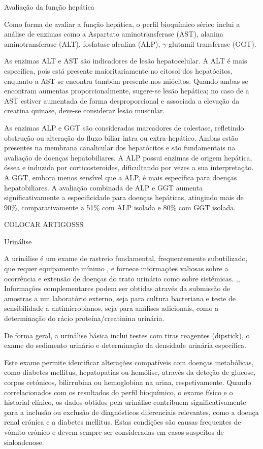 Avaliação da função hepática


Como forma de avaliar a função hepática, o perfil bioquímico sérico inclui a análise de enzimas como a Aspartato aminotransferase (AST), alanina aminotransferase (ALT), fosfatase alcalina (ALP), $\gamma$-glutamil transferase (GGT). 


As enzimas ALT e AST são indicadores de lesão hepatocelular. A ALT é mais específica, pois está presente maioritariamente no citosol dos hepatócitos, enquanto a AST se encontra também presente nos miócitos. Quando ambas se encontram aumentas proporcionalmente, sugere-se lesão hepática; no caso de a AST estiver aumentada de forma desproporcional e associada a elevação da creatina quinase, deve-se considerar lesão muscular.


As enzimas ALP e GGT são consideradas marcadores de colestase, refletindo obstrução ou alteração do fluxo biliar intra ou extra-hepático. Ambas estão presentes na membrana canalicular dos hepatócitos e são fundamentais na avaliação de doenças hepatobiliares. A ALP possui enzimas de origem hepática, óssea e induzida por corticosteroides, dificultando por vezes a sua interpretação. A GGT, embora menos sensível que a ALP, é mais específica para doenças hepatobiliares. A avaliação combinada de ALP e GGT aumenta significativamente a especificidade para doenças hepáticas, atingindo mais de 90\%, comparativamente a 51\% com ALP isolada e 80\% com GGT isolada. 

COLOCAR ARTIGOSSS

Urinálise


A urinálise é um exame de rastreio fundamental, frequentemente subutilizado, que requer equipamento mínimo \cite{Ristic2011},\cite{Kumar2017} e fornece informações valiosas sobre a ocorrência e extensão de doenças do trato urinário como sobre sistémicas. \cite{Ristic2011},\cite{Yadav2020},\cite{Reine2005} Informações complementares podem ser obtidas através da submissão de amostras a um laboratório externo, seja para cultura bacteriana e teste de sensibilidade a antimicrobianos, seja para análises adicionais, como a determinação do rácio proteína/creatinina urinária. \cite{Ristic2011} 


De forma geral, a urinálise básica inclui testes com tiras reagentes (dipstick), o exame do sedimento urinário e determinação da densidade urinária específica. \cite{Ristic2011} 


Este exame permite identificar alterações compatíveis com doenças metabólicas, como diabetes mellitus, hepatopatias ou hemólise, através da deteção de glucose, corpos cetónicos, bilirrubina ou hemoglobina na urina, respetivamente. \cite{Parrah2013} 
Quando correlacionados com os resultados do perfil bioquímico, o exame físico e o historial clínico, os dados obtidos pela urinálise contribuem significativamente para a inclusão ou exclusão de diagnósticos diferenciais relevantes, como a doença renal crónica e a diabetes mellitus. \cite{Reine2005} Estas condições são causas frequentes de vómito crónico e devem sempre ser consideradas em casos suspeitos de sialoadenose.


